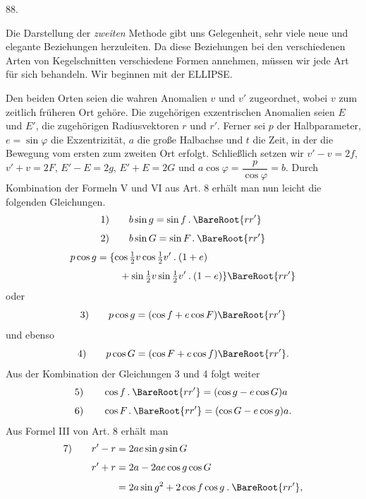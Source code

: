 \par{}\medskip
\hypertarget{native-118-article088}{}
\begin{center}88.\end{center}
Die Darstellung der \textit{zweiten} Methode gibt uns Gelegenheit, sehr viele neue und elegante Beziehungen herzuleiten. Da diese Beziehungen bei den verschiedenen Arten von Kegelschnitten verschiedene Formen annehmen, müssen wir jede Art für sich behandeln. Wir beginnen mit der ELLIPSE.

Den beiden Orten seien die wahren Anomalien $v$ und $v'$ zugeordnet, wobei $v$ zum zeitlich früheren Ort gehöre. Die zugehörigen exzentrischen Anomalien seien $E$ und $E'$, die zugehörigen Radiusvektoren $r$ und $r'$. Ferner sei $p$ der Halbparameter, $e=\sin\varphi$ die Exzentrizität, $a$ die große Halbachse und $t$ die Zeit, in der die Bewegung vom ersten zum zweiten Ort erfolgt. Schließlich setzen wir $v'-v=2f$, $v'+v=2F$, $E'-E=2g$, $E'+E=2G$ und $a\cos\varphi=\dfrac{p}{\cos\varphi}=b$. Durch Kombination der Formeln V und VI aus Art. 8 erhält man nun leicht die folgenden Gleichungen.
\[
\begin{aligned}
\mathrm{1)}\qquad&b\sin g=\sin f\mathbin{.}\BareRoot{rr'}\\[4pt]
\mathrm{2)}\qquad&b\sin G=\sin F\mathbin{.}\BareRoot{rr'}
\end{aligned}
\]
\[
\begin{aligned}
p\cos g={}&\{\cos\tfrac12v\cos\tfrac12v'\mathbin{.}(1+e)\\[3pt]
&\quad+\sin\tfrac12v\sin\tfrac12v'\mathbin{.}(1-e)\}\BareRoot{rr'}
\end{aligned}
\]
oder
\[
\mathrm{3)}\qquad p\cos g=(\cos f+e\cos F)\BareRoot{rr'}
\]
und ebenso
\[
\mathrm{4)}\qquad p\cos G=(\cos F+e\cos f)\BareRoot{rr'}.
\]
Aus der Kombination der Gleichungen 3 und 4 folgt weiter
\[
\begin{aligned}
\mathrm{5)}\qquad&\cos f\mathbin{.}\BareRoot{rr'}=(\cos g-e\cos G)a\\[4pt]
\mathrm{6)}\qquad&\cos F\mathbin{.}\BareRoot{rr'}=(\cos G-e\cos g)a.
\end{aligned}
\]
Aus Formel III von Art. 8 erhält man
\[
\begin{aligned}
\mathrm{7)}\qquad r'-r&=2ae\sin g\sin G\\[4pt]
r'+r&=2a-2ae\cos g\cos G\\[4pt]
&=2a\sin g^2+2\cos f\cos g\mathbin{.}\BareRoot{rr'},
\end{aligned}
\]
